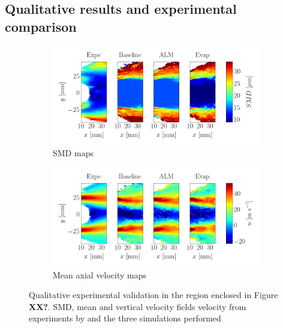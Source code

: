 \clearpage


\subsection{Qualitative results and experimental comparison}


\begin{figure}[h!]
\centering
\begin{subfigure}[b]{1.0\textwidth}
	\centering 
	\includegraphics[scale=0.8]{./part3_applications/figures_ch9_lagrangian/simus_expe_validation/subplots_maps_SMD.png}
   \caption{SMD maps}
\end{subfigure}

\vspace*{0.1in}

\begin{subfigure}[b]{1.0\textwidth}
	\centering
	\includegraphics[scale=0.4]{./part3_applications/figures_ch9_lagrangian/simus_expe_validation/subplots_maps_axial_velocity.png}
   \caption{Mean axial velocity maps}
\end{subfigure}
%
%
\caption[Qualitative experimental validation]{Qualitative experimental validation in the region enclosed in Figure \textbf{XX?}. SMD, mean and vertical velocity fields velocity from experiments by  and the three simulations performed}
\label{fig:validation_BIMER_lgs}
\end{figure}

